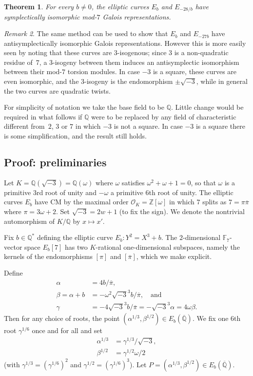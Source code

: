 \documentclass[12pt]{amsart}
\newcommand{\F}{\mathbb{F}}
\newcommand{\Q}{\mathbb{Q}}
\newcommand{\Z}{\mathbb{Z}}
\newcommand{\Qbar}{{\overline{\Q}}}
\newcommand{\OO}{\mathscr{O}}
\def\w{\omega}
\def\r3{\sqrt{-3}}
\def\pibar{\overline{\pi}}
\numberwithin{equation}{section}
\newtheorem{theorem}{Theorem}[section]
\theoremstyle{definition}
\theoremstyle{remark}
\newtheorem{remark}[theorem]{Remark}
\begin{document}
\begin{theorem}
For every $b\not=0$, the elliptic curves $E_b$ and $E_{-28/b}$ have
symplectically isomorphic mod-$7$ Galois representations.
\end{theorem}

\begin{remark}
The same method can be used to show that $E_b$ and $E_{-27b}$ have
antisymplectically isomorphic Galois representations.  However this is
more easily seen by noting that these curves are $3$-isogenous; since
$3$ is a non-quadratic residue of~$7$, a $3$-isogeny between them
induces an antisymplectic isomorphism between their mod-$7$ torsion
modules.  In case $-3$ is a square, these curves are even isomorphic,
and the $3$-isogeny is the endomorphism $\pm\r3$, while in
general the two curves are quadratic twists.
\end{remark}

For simplicity of notation we take the base field to be $\Q$.  Little
change would be required in what follows if $\Q$ were to be replaced
by any field of characteristic different from~$2$, $3$ or $7$ in which
$-3$ is not a square.  In case $-3$ is a square there is some
simplification, and the result still holds.

\subsection{Proof: preliminaries}
Let $K=\Q(\r3)=\Q(\w)$ where $\w$ satisfies
$\w^2+\w+1=0$, so that $\w$ is a primitive $3$rd root of
unity and $-\w$ a primitive $6$th root of unity.  The elliptic
curves $E_b$ have CM by the maximal order $\OO_K=\Z[\w]$ in which
$7$ splits as $7=\pi\pibar$ where $\pi=3\w+2$.  Set
$\r3=2w+1$ (to fix the sign).  We denote the nontrivial
automorphism of $K/\Q$ by $x\mapsto x'$.

Fix $b\in\Q^*$ defining the elliptic curve $E_b: Y^2=X^3+b$.  The
$2$-dimensional $\F_7$-vector space $E_b[7]$ has two $K$-rational
one-dimensional subspaces, namely the kernels of the endomorphisms
$[\pi]$ and $[\pibar]$, which we make explicit.

Define
\begin{align}
\alpha&=4b/\pibar,\\
\beta=\alpha+b&=-\w^2\r3^3b/\pibar,\quad\text{and}\\
\gamma&=-4\r3^3b/\pibar = -\r3^3\alpha = 4\w\beta.
\end{align}
Then for any choice of roots, the point $(\alpha^{1/3},\beta^{1/2})\in
E_b(\Qbar)$.  We fix one $6$th root $\gamma^{1/6}$ once and for all
and set
\begin{align}
\alpha^{1/3} &= \gamma^{1/3}/\r3,\\
\beta^{1/2} &= \gamma^{1/2}\w/2
\end{align}
(with $\gamma^{1/3}=(\gamma^{1/6})^2$ and $\gamma^{1/2}=(\gamma^{1/6})^3$).  Let
$P=(\alpha^{1/3},\beta^{1/2})\in E_b(\Qbar)$.
\end{document}
